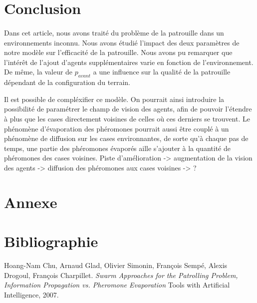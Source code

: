 \documentclass{article}
\begin{document}
\section{Conclusion}
\paragraph{} Dans cet article, nous avons traité du problème de la patrouille dans un environnements inconnu.
Nous avons étudié l'impact des deux paramètres de notre modèle sur l'efficacité de la patrouille. Nous avons pu remarquer que 
l'intérêt de l'ajout d'agents supplémentaires varie en fonction de l'environnement. De même, la valeur de $p_{avant}$ a une influence sur la 
qualité de la patrouille dépendant de la configuration du terrain.

Il est possible de compléxifier ce modèle. On pourrait ainsi introduire la possibilité de paramétrer le champ de vision des agents, afin de pouvoir l'étendre à plus que les cases directement voisines de celles où ces derniers se trouvent.
Le phénomène d'évaporation des phéromones pourrait aussi être couplé à un phénomène de diffusion sur les cases environnantes, de sorte qu'à chaque pas de temps, une partie des phéromones évaporés aille s'ajouter à la quantité de phéromones des cases voisines.
Piste d'amélioration
    -> augmentation de la vision des agents
    -> diffusion des phéromones aux cases voisines
    -> ?
\appendix
\section{Annexe}
\listoffigures
\section*{Bibliographie}
\begin{thebibliography}{1}
    Hoang-Nam Chu, Arnaud Glad, Olivier Simonin, François Sempé, Alexis Drogoul, François Charpillet.
    \textit{Swarm Approaches for the Patrolling Problem, Information Propagation vs. Pheromone Evaporation}
    Tools with Artificial Intelligence, 2007.
\end{thebibliography}
\end{document}

